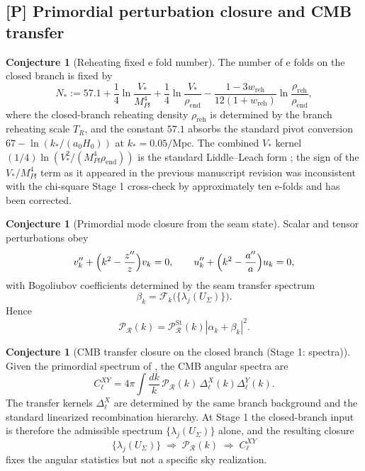 \documentclass[11pt,a4paper]{article}
\theoremstyle{definition}
\newtheorem{conjecture}[theorem]{Conjecture}
\theoremstyle{remark}
\begin{document}
\subsection{[P] Primordial perturbation closure and CMB transfer}

\begin{conjecture}[Reheating fixed e fold number]
\label{thm:reheating_fixed_efolds}
The number of e folds on the closed branch is fixed by
\[
N_*
:=
57.1
+\frac14\ln\frac{V_*}{M_{Pl}^4}
+\frac14\ln\frac{V_*}{\rho_{\mathrm{end}}}
-\frac{1-3w_{\mathrm{reh}}}{12(1+w_{\mathrm{reh}})}
\ln\frac{\rho_{\mathrm{reh}}}{\rho_{\mathrm{end}}},
\]
where the closed-branch reheating density $\rho_{\mathrm{reh}}$ is determined by the branch
reheating scale $T_R$, and the constant $57.1$ absorbs the standard pivot conversion
$67-\ln(k_*/(a_0H_0))$ at $k_*=0.05/\mathrm{Mpc}$. The combined $V_*$ kernel
$(1/4)\ln(V_*^2/(M_{Pl}^4\rho_{\mathrm{end}}))$ is the standard Liddle--Leach form
\cite{LiddleLeach2003}; the sign of the $V_*/M_{Pl}^4$ term as it appeared in the previous
manuscript revision was inconsistent with the chi-square Stage 1 cross-check by approximately ten
e-folds and has been corrected.
\end{conjecture}

\begin{conjecture}[Primordial mode closure from the seam state]
\label{thm:primordial_mode_closure_seam_state}
Scalar and tensor perturbations obey
\[
v_k''+\Bigl(k^2-\frac{z''}{z}\Bigr)v_k=0,
\qquad
u_k''+\Bigl(k^2-\frac{a''}{a}\Bigr)u_k=0,
\]
with Bogoliubov coefficients determined by the seam transfer spectrum
\[
\beta_k=\mathcal F_k\bigl(\{\lambda_j(U_\Sigma)\}\bigr).
\]
Hence
\[
\mathcal P_{\mathcal R}(k)=\mathcal P_{\mathcal R}^{\mathrm{St}}(k)|\alpha_k+\beta_k|^2.
\]
\end{conjecture}

\begin{conjecture}[CMB transfer closure on the closed branch (Stage 1: spectra)]
\label{thm:cmb_transfer_closure_closed_branch}
Given the primordial spectrum of
, the CMB angular spectra are
\[
C_\ell^{XY}=4\pi\int \frac{dk}{k}\,\mathcal P_{\mathcal R}(k)\,\Delta_\ell^X(k)\Delta_\ell^Y(k).
\]
The transfer kernels \(\Delta_\ell^X\) are determined by the same branch background and the
standard linearized recombination hierarchy. At Stage 1 the closed-branch input is therefore the
admissible spectrum $\{\lambda_j(U_\Sigma)\}$ alone, and the resulting closure
\[
\{\lambda_j(U_\Sigma)\}\;\Longrightarrow\;\mathcal P_{\mathcal R}(k)\;\Longrightarrow\;C_\ell^{XY}
\]
fixes the angular statistics but not a specific sky realization.
\end{conjecture}
\end{document}
